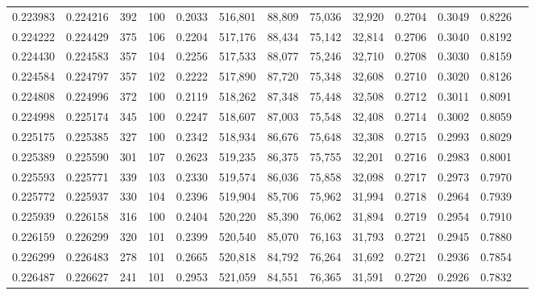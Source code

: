 \begin{tabular}{rrrrrrrrrrrrr}
0.223983 & 0.224216 &   392 & 100 &                                     0.2033 & 516,801 &  88,809 &  75,036 &  32,920 & 0.2704 & 0.3049 & 0.8226 \\
0.224222 & 0.224429 &   375 & 106 &                                     0.2204 & 517,176 &  88,434 &  75,142 &  32,814 & 0.2706 & 0.3040 & 0.8192 \\
0.224430 & 0.224583 &   357 & 104 &                                     0.2256 & 517,533 &  88,077 &  75,246 &  32,710 & 0.2708 & 0.3030 & 0.8159 \\
0.224584 & 0.224797 &   357 & 102 &                                     0.2222 & 517,890 &  87,720 &  75,348 &  32,608 & 0.2710 & 0.3020 & 0.8126 \\
0.224808 & 0.224996 &   372 & 100 &                                     0.2119 & 518,262 &  87,348 &  75,448 &  32,508 & 0.2712 & 0.3011 & 0.8091 \\
0.224998 & 0.225174 &   345 & 100 &                                     0.2247 & 518,607 &  87,003 &  75,548 &  32,408 & 0.2714 & 0.3002 & 0.8059 \\
0.225175 & 0.225385 &   327 & 100 &                                     0.2342 & 518,934 &  86,676 &  75,648 &  32,308 & 0.2715 & 0.2993 & 0.8029 \\
0.225389 & 0.225590 &   301 & 107 &                                     0.2623 & 519,235 &  86,375 &  75,755 &  32,201 & 0.2716 & 0.2983 & 0.8001 \\
0.225593 & 0.225771 &   339 & 103 &                                     0.2330 & 519,574 &  86,036 &  75,858 &  32,098 & 0.2717 & 0.2973 & 0.7970 \\
0.225772 & 0.225937 &   330 & 104 &                                     0.2396 & 519,904 &  85,706 &  75,962 &  31,994 & 0.2718 & 0.2964 & 0.7939 \\
0.225939 & 0.226158 &   316 & 100 &                                     0.2404 & 520,220 &  85,390 &  76,062 &  31,894 & 0.2719 & 0.2954 & 0.7910 \\
0.226159 & 0.226299 &   320 & 101 &                                     0.2399 & 520,540 &  85,070 &  76,163 &  31,793 & 0.2721 & 0.2945 & 0.7880 \\
0.226299 & 0.226483 &   278 & 101 &                                     0.2665 & 520,818 &  84,792 &  76,264 &  31,692 & 0.2721 & 0.2936 & 0.7854 \\
0.226487 & 0.226627 &   241 & 101 &                                     0.2953 & 521,059 &  84,551 &  76,365 &  31,591 & 0.2720 & 0.2926 & 0.7832 \\

\end{tabular}
